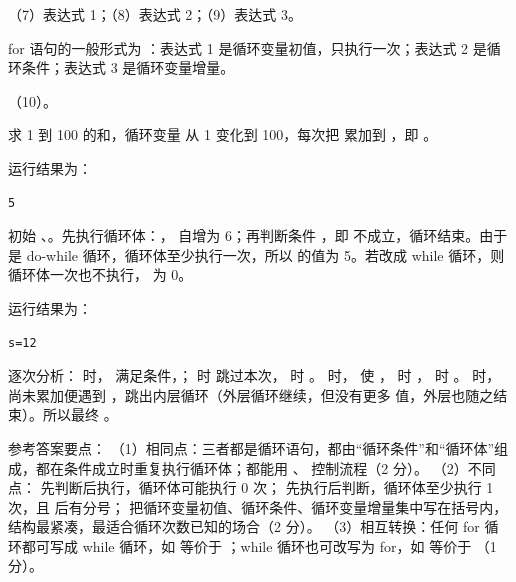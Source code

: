 \documentclass[a4paper,11pt]{article}
\begin{document}
\q （7）表达式 1；（8）表达式 2；（9）表达式 3。\begin{analysis}for 语句的一般形式为 ：表达式 1 是循环变量初值，只执行一次；表达式 2 是循环条件；表达式 3 是循环变量增量。\end{analysis}

\q （10）。\begin{analysis}求 1 到 100 的和，循环变量  从 1 变化到 100，每次把  累加到 ，即 。\end{analysis}


\q 运行结果为：
\begin{lstlisting}
5
\end{lstlisting}
\begin{analysis}初始 、。先执行循环体：， 自增为 6；再判断条件 ，即  不成立，循环结束。由于是 do-while 循环，循环体至少执行一次，所以  的值为 5。若改成 while 循环，则循环体一次也不执行， 为 0。\end{analysis}

\q 运行结果为：
\begin{lstlisting}
s=12
\end{lstlisting}
\begin{analysis}逐次分析： 时， 满足条件，； 时  跳过本次， 时 。 时， 使 ， 时 ， 时 。 时， 尚未累加便遇到 ，跳出内层循环（外层循环继续，但没有更多  值，外层也随之结束）。所以最终 。\end{analysis}


\q 参考答案要点：
（1）相同点：三者都是循环语句，都由“循环条件”和“循环体”组成，都在条件成立时重复执行循环体；都能用 、 控制流程（2 分）。
（2）不同点： 先判断后执行，循环体可能执行 0 次； 先执行后判断，循环体至少执行 1 次，且  后有分号； 把循环变量初值、循环条件、循环变量增量集中写在括号内，结构最紧凑，最适合循环次数已知的场合（2 分）。
（3）相互转换：任何 for 循环都可写成 while 循环，如  等价于 ；while 循环也可改写为 for，如  等价于 （1 分）。
\end{document}
